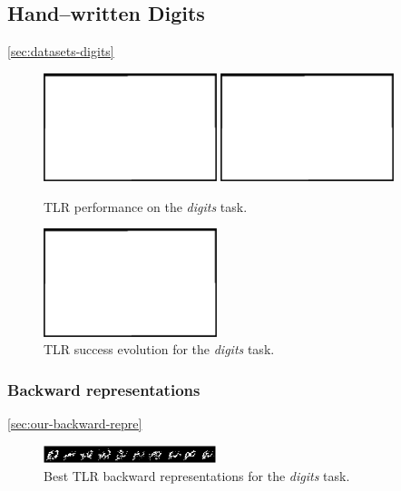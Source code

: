 
\subsection{Hand--written Digits} 
\label{sec:tlr-digits} 

\ref{sec:datasets-digits} 
\begin{figure}[H]
  \centering
  \includegraphics[width=0.45\textwidth]{img/placeholder.png}   
  \includegraphics[width=0.45\textwidth]{img/placeholder.png}    
  \caption{TLR performance on the \emph{digits} task.}
  \label{fig:results-two-lambdas-digits-success}
\end{figure}

\begin{figure}[H]
  \centering
  \includegraphics[width=0.45\textwidth]{img/placeholder.png}    
  \caption{TLR success evolution for the \emph{digits} task.}
  \label{fig:results-two-lambdas-digits-epoch} 
\end{figure}

\subsubsection{Backward representations} 
\ref{sec:our-backward-repre} 
\begin{figure}[H]
  \centering
  \includegraphics[width=0.45\textwidth]{img/digits_tlr.png}    
  \caption{Best TLR backward representations for the \emph{digits} task.}
  \label{fig:results-two-lambdas-digits-backward} 
\end{figure}
